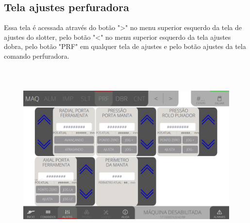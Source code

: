 \thispagestyle{fancy}
\vspace*{40 pt}
\subsection{Tela ajustes perfuradora}\label{telaAjustesPerfuradora}
Essa tela é acessada através do botão "\textgreater" no menu superior esquerdo da tela de ajustes do slotter, pelo botão "\textless{}" no menu superior esquerdo da tela 
ajustes dobra, pelo botão "PRF" em qualquer tela de ajustes e pelo botão ajustes da tela comando perfuradora.
\vspace*{\fill}
\begin{figure}[h]
  \centering
  \includegraphics[width=576px,height=360px]{src/imagesFlexo/06-drilling/settings/e-Tela-Principal.png}
\end{figure}
\vspace*{\fill}

\newpage
\thispagestyle{fancy}
\vspace*{40 pt}
